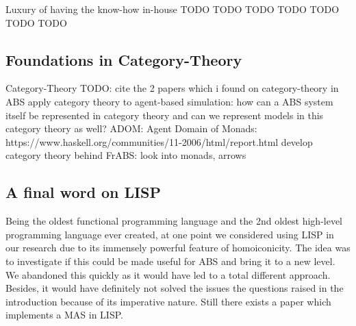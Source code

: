 Luxury of having the know-how in-house
TODO \cite{courtney_yampa_2003}
TODO \cite{nilsson_functional_2002}
TODO \cite{hudak_arrows_2003}
TODO \cite{mun_hon_functional_2005}
TODO \cite{meisinger_game-engine-architektur_2010}
TODO \cite{nilsson_declarative_2014}
TODO \cite{perez_functional_2016}


\subsection{Foundations in Category-Theory}
Category-Theory \cite{Pierce1991} \cite{spivak_category_2014}
TODO: cite the 2 papers which i found on category-theory in ABS
apply category theory to agent-based simulation: how can a ABS system itself be represented in category theory and can we represent models in this category theory as well?
ADOM: Agent Domain of Monads: https://www.haskell.org/communities/11-2006/html/report.html
develop category theory behind FrABS: look into monads, arrows

\subsection{A final word on LISP}
Being the oldest functional programming language and the 2nd oldest high-level programming language ever created, at one point we considered using LISP in our research due to its immensely powerful feature of homoiconicity. The idea was to investigate if this could be made useful for ABS and bring it to a new level. We abandoned this quickly as it would have led to a total different approach. Besides, it would have definitely not solved the issues the questions raised in the introduction because of its imperative nature. Still there exists a paper \cite{kawabe_nepi2programming_2000} which implements a MAS in LISP.